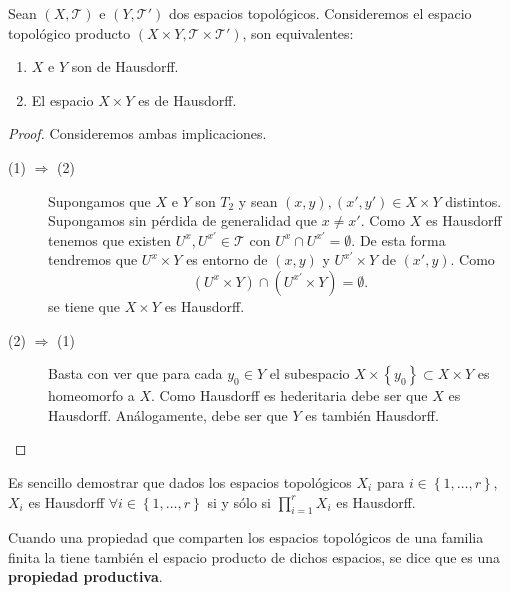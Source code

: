 \begin{prop}
Sean $\displaystyle \left(X, \mathcal{T}\right) $ e $\displaystyle \left(Y, \mathcal{T}'\right) $ dos espacios topológicos. Consideremos el espacio topológico producto $\displaystyle \left(X \times Y, \mathcal{T} \times \mathcal{T}'\right) $, son equivalentes:
\begin{enumerate}
\item $\displaystyle X $ e $\displaystyle Y $ son de Hausdorff.
\item El espacio $\displaystyle X \times Y $ es de Hausdorff.
\end{enumerate}
\end{prop}
\begin{proof}
Consideremos ambas implicaciones. 
\begin{description}
\item[(1) $\displaystyle \Rightarrow $ (2)] Supongamos que $\displaystyle X $ e $\displaystyle Y $ son $\displaystyle T_{2} $ y sean $\displaystyle \left(x,y\right), \left(x', y'\right)\in X \times Y $ distintos. Supongamos sin pérdida de generalidad que $\displaystyle x \neq x' $. Como $\displaystyle X $ es Hausdorff tenemos que existen $\displaystyle U^{x}, U^{x'}\in \mathcal{T} $ con $\displaystyle U^{x} \cap U^{x'}= \emptyset  $. 
	De esta forma tendremos que $\displaystyle U^{x} \times Y $ es entorno de $\displaystyle \left(x,y\right) $ y $\displaystyle U^{x'}\times Y $ de $\displaystyle \left(x', y\right) $. Como
	\[\left(U^{x} \times Y\right)\cap \left(U^{x'} \times Y\right) = \emptyset .\]
	se tiene que $\displaystyle X \times Y $ es Hausdorff. 
\item[(2) $\displaystyle \Rightarrow $ (1)] Basta con ver que para cada $\displaystyle y_{0} \in Y $ el subespacio $\displaystyle X \times \left\{ y_{0}\right\} \subset X \times Y $ es homeomorfo a $\displaystyle X $. Como Hausdorff es hederitaria debe ser que $\displaystyle X $ es Hausdorff. Análogamente, debe ser que $\displaystyle Y $ es también Hausdorff. 
\end{description}
\end{proof}
\begin{observation}
	Es sencillo demostrar que dados los espacios topológicos $\displaystyle X_{i} $ para $\displaystyle i \in \left\{ 1, \ldots, r\right\}  $, $\displaystyle X_{i} $ es Hausdorff $\displaystyle \forall i \in \left\{ 1, \ldots, r\right\}  $ si y sólo si $\displaystyle \prod^{r}_{i = 1}X_{i} $ es Hausdorff. 
\end{observation}
\begin{notation}
Cuando una propiedad que comparten los espacios topológicos de una familia finita la tiene también el espacio producto de dichos espacios, se dice que es una \textbf{propiedad productiva}. 
\end{notation}
